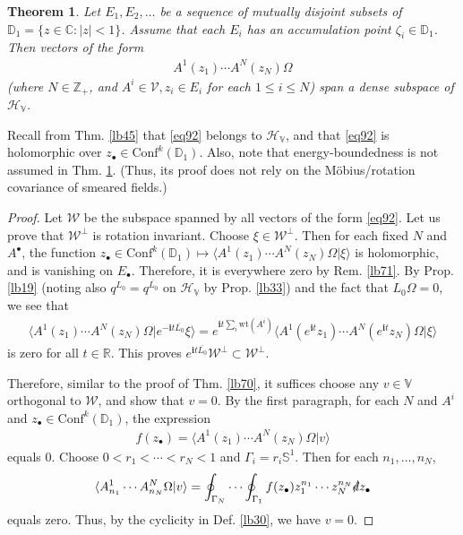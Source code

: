 \documentclass[12pt,b5paper,notitlepage]{article}
\theoremstyle{definition}
\theoremstyle{plain}
\newtheorem{thm}[df]{Theorem}
\newcommand{\mc}{\mathcal}
\newcommand{\ovl}{\overline}
\newcommand{\Conf}{\mathrm{Conf}}
\newcommand{\bk}[1]{\langle {#1}\rangle}
\newcommand{\im}{\mathbf{i}}
\newcommand{\blt}{\bullet}
\newcommand{\Vbb}{\mathbb V}
\newcommand{\Cbb}{\mathbb C}
\newcommand{\Zbb}{\mathbb Z}
\newcommand{\Rbb}{\mathbb R}
\newcommand{\Dbb}{\mathbb D}
\newcommand{\wt}{\mathrm{wt}}
\newcommand{\Sbb}{{\mathbb S}}
\newcommand{\HV}{\mathcal H_{\mathbb V}}
\newcommand{\ointn}{\oint\nolimits}
\newcommand{\sd}{\slashed{d}}
\numberwithin{equation}{section}
\begin{document}
\begin{thm}\label{lb72}
Let $E_1,E_2,\dots$ be a sequence of mutually disjoint subsets of $\Dbb_1=\{z\in\Cbb:|z|<1\}$. Assume that each $E_i$ has an accumulation point $\zeta_i\in \Dbb_1$. Then vectors of the form
\begin{align}\label{eq92}
A^1(z_1)\cdots A^N(z_N)\Omega
\end{align}
(where $N\in\Zbb_+$, and $A^i\in\mc V,z_i\in E_i$ for each $1\leq i\leq N$) span a dense subspace of $\HV$.
\end{thm}


Recall from Thm. \ref{lb45} that \eqref{eq92} belongs to $\HV$, and that \eqref{eq92} is holomorphic over $z_\blt\in\Conf^k(\Dbb_1)$. Also, note that energy-boundedness is not assumed in Thm. \ref{lb72}. (Thus, its proof does not rely on the M\"obius/rotation covariance of smeared fields.)

\begin{proof}
Let $\mc W$ be the subspace spanned by all vectors of the form \eqref{eq92}. Let us prove that $\mc W^\perp$ is rotation invariant. Choose $\xi\in\mc W^\perp$. Then for each fixed $N$ and $A^\blt$, the function $z_\blt\in \Conf^k(\Dbb_1)\mapsto \bk{A^1(z_1)\cdots A^N(z_N)\Omega|\xi}$ is holomorphic, and is vanishing on $E_\blt$. Therefore, it is everywhere zero by Rem. \ref{lb71}. By Prop. \ref{lb19} (noting also $q^{L_0}=q^{\ovl{L_0}}$ on $\HV$ by Prop. \ref{lb33}) and the fact that $L_0\Omega=0$, we see that
\begin{align*}
\bk{A^1(z_1)\cdots A^N(z_N)\Omega|e^{-\im t\ovl{L_0}}\xi}=e^{\im t\sum_i\wt(A^i)}\bk{A^1(e^{\im t}z_1)\cdots A^N(e^{\im t}z_N)\Omega|\xi}
\end{align*}
is zero for all $t\in\Rbb$. This proves $e^{\im t\ovl{L_0}}\mc W^\perp\subset\mc W^\perp$.

Therefore, similar to the proof of Thm. \ref{lb70}, it suffices choose any $v\in\Vbb$ orthogonal to $\mc W$, and show that $v=0$. By the first paragraph, for each $N$ and $A^i$ and $z_\blt\in\Conf^k(\Dbb_1)$, the expression
\begin{align*}
f(z_\blt)=\bk{A^1(z_1)\cdots A^N(z_N)\Omega|v}
\end{align*}
equals $0$. Choose $0<r_1<\cdots<r_N<1$ and $\Gamma_i=r_i\Sbb^1$. Then for each $n_1,\dots,n_N$,
\begin{align*}
\bk{A^1_{n_1}\cdots A^N_{n_N}\Omega|v}=\ointn_{\Gamma_N}\cdots\ointn_{\Gamma_1}f(z_\blt)z_1^{n_1}\cdots z_N^{n_N}\sd z_\blt
\end{align*}
equals zero. Thus, by the cyclicity in Def. \ref{lb30}, we have $v=0$.
\end{proof}
\end{document}
